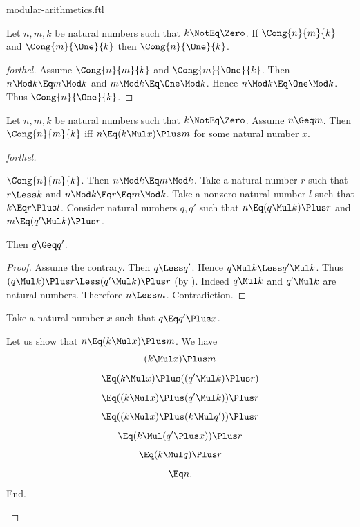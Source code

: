 \documentclass{stex}
\begin{document}
\begin{smodule}{modular-arithmetics.ftl}
\begin{proposition*}[forthel]
  Let $n, m, k$ be natural numbers such that $k \NotEq \Zero$.
  If $\Cong{n}{m}{k}$ and $\Cong{m}{\One}{k}$ then $\Cong{n}{\One}{k}$.
\end{proposition*}
\begin{proof}[forthel]
  Assume $\Cong{n}{m}{k}$ and $\Cong{m}{\One}{k}$.
  Then $n \Mod k \Eq m \Mod k$ and $m \Mod k \Eq \One \Mod k$.
  Hence $n \Mod k \Eq \One \Mod k$.
  Thus $\Cong{n}{\One}{k}$.
\end{proof}

\begin{proposition*}[forthel]
  Let $n, m, k$ be natural numbers such that $k \NotEq \Zero$.
  Assume $n \Geq m$.
  Then $\Cong{n}{m}{k}$ iff $n \Eq (k \Mul x) \Plus m$ for some natural number $x$.
\end{proposition*}
\begin{proof}[forthel]
  \begin{case}{$\Cong{n}{m}{k}$.}
    Then $n \Mod k \Eq m \Mod k$.
    Take a natural number $r$ such that $r \Less k$ and $n \Mod k \Eq r \Eq m \Mod k$.
    Take a nonzero natural number $l$ such that $k \Eq r \Plus l$.
    Consider natural numbers $q,q'$ such that $n \Eq (q \Mul k) \Plus r$ and $m \Eq (q' \Mul k) \Plus r$.

    Then $q \Geq q'$.
    \begin{proof}
      Assume the contrary.
      Then $q \Less q'$.
      Hence $q \Mul k \Less q' \Mul k$.
      Thus $(q \Mul k) \Plus r \Less (q' \Mul k) \Plus r$ (by ).
      Indeed $q \Mul k$ and $q' \Mul k$ are natural numbers.
      Therefore $n \Less m$.
      Contradiction.
    \end{proof}

    Take a natural number $x$ such that $q \Eq q' \Plus x$.

    Let us show that $n \Eq (k \Mul x) \Plus m$.
      We have
      \[  (k \Mul x) \Plus m                       \]
      \[    \Eq (k \Mul x) \Plus ((q' \Mul k) \Plus r)  \]
      \[    \Eq ((k \Mul x) \Plus (q' \Mul k)) \Plus r  \]
      \[    \Eq ((k \Mul x) \Plus (k \Mul q')) \Plus r  \]
      \[    \Eq (k \Mul (q' \Plus x)) \Plus r            \]
      \[    \Eq (k \Mul q) \Plus r                   \]
      \[    \Eq n.                                \]
    End.
  \end{case}


\end{proof}
\end{smodule}
\end{document}
